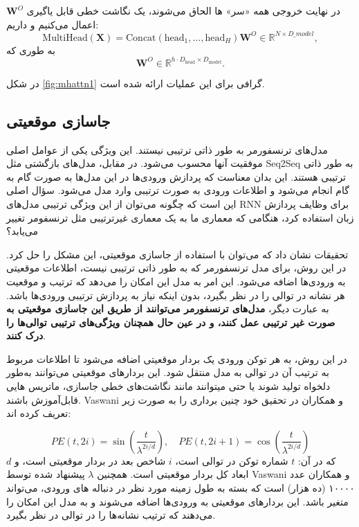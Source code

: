 در نهایت خروجی همه «سر» ها الحاق می‌شوند، یک نگاشت خطی قابل یاگیری
$\mathbf{W}^O$
اعمال می‌کنیم و داریم:
$$
\text{MultiHead}(\mathbf{X}) = \text{Concat}(\text{head}_1, \dots, \text{head}_H) \mathbf{W}^O \in \mathbb{R}^{N \times D\_{model}},
$$
به طوری که
$$
\mathbf{W}^O \in \mathbb{R}^{h \cdot D_{\text{head}} \times D_{\text{model}}}.
$$

در شکل \ref{fig:mhattn1} گرافی برای این عملیات ارائه شده است.

\subsection{جاسازی موقعیتی}

مدل‌های ترنسفورمر به طور ذاتی ترتیبی نیستند. این ویژگی یکی از عوامل اصلی موفقیت آنها محسوب می‌شود. در مقابل، مدل‌های بازگشتی مثل Seq2Seq به طور ذاتی ترتیبی هستند. این بدان معناست که پردازش ورودی‌ها در این مدل‌ها به صورت گام به گام انجام می‌شود و اطلاعات ورودی به صورت ترتیبی وارد مدل می‌شود. سؤال اصلی این است که چگونه می‌توان از این ویژگی ترتیبی مدل‌های RNN برای وظایف پردازش زبان استفاده کرد، هنگامی که معماری ما به یک معماری غیرترتیبی مثل ترنسفومر تغییر می‌یابد؟

تحقیقات نشان داد که می‌توان با استفاده از جاسازی موقعیتی، این مشکل را حل کرد. در این روش، برای مدل ترنسفورمر که به طور ذاتی ترتیبی نیست، اطلاعات موقعیتی به ورودی‌ها اضافه می‌شود. این امر به مدل این امکان را می‌دهد که ترتیب و موقعیت هر نشانه در توالی را در نظر بگیرد، بدون اینکه نیاز به پردازش ترتیبی ورودی‌ها باشد. به عبارت دیگر، \textbf{مدل‌های ترنسفورمر می‌توانند از طریق این جاسازی موقعیتی به صورت غیر ترتیبی عمل کنند، و در عین حال همچنان ویژگی‌های ترتیبی توالی‌ها را درک کنند}.

در این روش، به هر توکن ورودی یک بردار موقعیتی اضافه می‌شود تا اطلاعات مربوط به ترتیب آن در توالی به مدل منتقل شود. این بردارهای موقعیتی می‌توانند به‌طور دلخواه تولید شوند یا حتی میتوانند مانند نگاشت‌های خطی جاسازی، ماتریس هایی قابل‌آموزش باشند. Vaswani و همکاران در تحقیق خود چنین برداری را  به صورت زیر تعریف کرده اند:

\begin{equation}
PE(t, 2i) = \sin\left( \frac{t}{\lambda^{2i/d}} \right), \quad PE(t, 2i+1) = \cos\left( \frac{t}{\lambda^{2i/d}} \right)
\end{equation}
که در آن:
$t$ شماره توکن در توالی است،
$i$ شاخص بعد در بردار موقعیتی است،
و
$d$ ابعاد کل بردار موقعیتی است. 
همچنین $\lambda$ پیشنهاد شده توسط Vaswani و همکاران عدد ۱۰۰۰۰ (ده هزار) است که بسته به طول زمینه%
مورد نظر در دنباله های ورودی، می‌تواند متغیر باشد. این بردارهای موقعیتی به ورودی‌ها اضافه می‌شوند و به مدل این امکان را می‌دهند که ترتیب نشانه‌ها را در توالی در نظر بگیرد.

